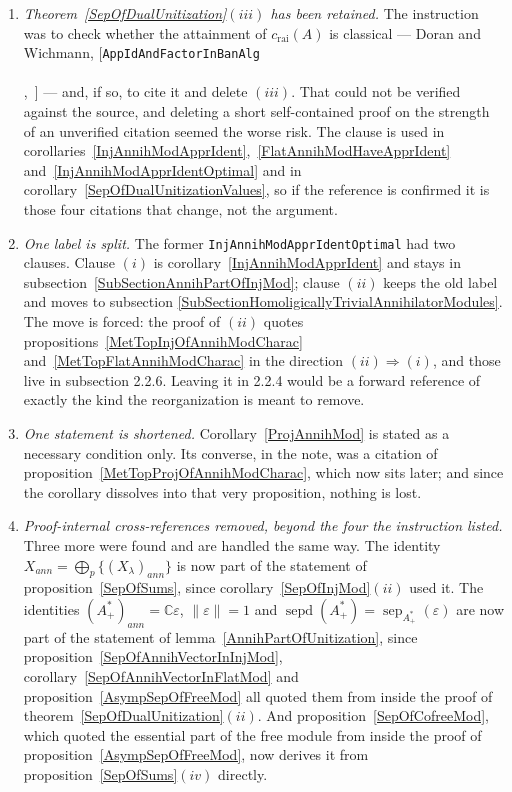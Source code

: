 \documentclass[11pt]{article}
\theoremstyle{plain}
\theoremstyle{definition}
\DeclareMathOperator{\sep}{sep}
\DeclareMathOperator{\sepd}{sepd}
\newcommand{\crai}{c_{\mathrm{rai}}}
\DeclareRobustCommand{\cite}[2][]{[\texttt{#2}\ifx\\#1\\\else,~#1\fi]}
\begin{document}
\begin{enumerate}[label = (\alph*)]
\item \emph{Theorem~\ref{SepOfDualUnitization}$(iii)$ has been retained.} The
instruction was to check whether the attainment of $\crai(A)$ is classical ---
Doran and Wichmann, \cite{AppIdAndFactorInBanAlg} --- and, if so, to cite it and
delete $(iii)$. That could not be verified against the source, and deleting a
short self-contained proof on the strength of an unverified citation seemed the
worse risk. The clause is used in
corollaries~\ref{InjAnnihModApprIdent},~\ref{FlatAnnihModHaveApprIdent}
and~\ref{InjAnnihModApprIdentOptimal} and in
corollary~\ref{SepOfDualUnitizationValues}, so if the reference is confirmed it
is those four citations that change, not the argument.

\item \emph{One label is split.} The former
\texttt{InjAnnihModApprIdentOptimal} had two clauses. Clause $(i)$ is
corollary~\ref{InjAnnihModApprIdent} and stays in
subsection~\ref{SubSectionAnnihPartOfInjMod}; clause $(ii)$ keeps the old label
and moves to subsection
\ref{SubSectionHomoligicallyTrivialAnnihilatorModules}. The move is forced: the
proof of $(ii)$ quotes propositions~\ref{MetTopInjOfAnnihModCharac}
and~\ref{MetTopFlatAnnihModCharac} in the direction $(ii)\Rightarrow(i)$, and
those live in subsection 2.2.6. Leaving it in 2.2.4 would be a forward reference
of exactly the kind the reorganization is meant to remove.

\item \emph{One statement is shortened.} Corollary~\ref{ProjAnnihMod} is stated
as a necessary condition only. Its converse, in the note, was a citation of
proposition~\ref{MetTopProjOfAnnihModCharac}, which now sits later; and since the
corollary dissolves into that very proposition, nothing is lost.

\item \emph{Proof-internal cross-references removed, beyond the four the
instruction listed.} Three more were found and are handled the same way. The
identity $X_{ann}=\bigoplus_p \{{(X_\lambda)}_{ann} \}$ is now part of the
statement of proposition~\ref{SepOfSums}, since
corollary~\ref{SepOfInjMod}$(ii)$ used it. The identities
${(A_+^*)}_{ann}=\mathbb{C}\varepsilon$, $\lVert\varepsilon\rVert=1$ and
$\sepd(A_+^*)=\sep_{A_+^*}(\varepsilon)$ are now part of the statement of
lemma~\ref{AnnihPartOfUnitization}, since
proposition~\ref{SepOfAnnihVectorInInjMod},
corollary~\ref{SepOfAnnihVectorInFlatMod} and
proposition~\ref{AsympSepOfFreeMod} all quoted them from inside the proof of
theorem~\ref{SepOfDualUnitization}$(ii)$. And
proposition~\ref{SepOfCofreeMod}, which quoted the essential part of the free
module from inside the proof of proposition~\ref{AsympSepOfFreeMod}, now derives
it from proposition~\ref{SepOfSums}$(iv)$ directly.


\end{enumerate}
\end{document}
